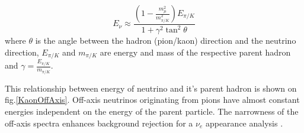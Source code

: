 
\begin{equation} \label{OffAxisEq}
E_{\nu}\approx\frac{\left(1-\frac{m_{\mu}^2}{m_{\pi / K}^2}\right) E_{\pi / K}}{1+\gamma^2\tan^2\theta}
\end{equation}
where $\theta$ is the angle between the hadron (pion/kaon) direction and the neutrino direction, $E_{\pi/K}$ and $m_{\pi/K}$ are energy and mass of the respective parent hadron and $\gamma=\frac{E_{\pi/K}}{m_{\pi/K}}$.
 
This relationship between energy of neutrino and it's parent hadron is shown on fig.\ref{KaonOffAxis}. Off-axis neutrinos originating from pions have almost constant energies independent on the energy of the parent particle. The narrowness of the off-axis spectra enhances background rejection for a $\nu_e$ appearance analysis \cite{NOvATechreport.pdf}. 
\fi

